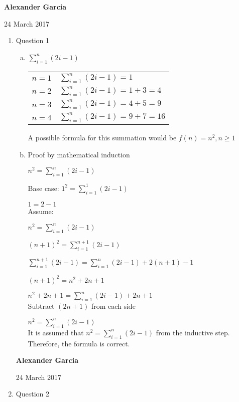 \documentclass[11pt]{article}
\begin{document}
\textbf{Alexander Garcia}

24 March 2017 \\
\begin{enumerate}

	\item Question 1

		\begin{enumerate}[(a)]

			\item $\sum^{n}_{i=1}(2i-1)$

				\begin{tabular}{ll}
					$n = 1$ & $\sum^{n}_{i=1} (2i-1) = 1$ \\

					$n = 2$ & $\sum^{n}_{i=1} (2i-1) = 1 + 3 = 4$ \\

					$n = 3$ & $\sum^{n}_{i=1} (2i-1) = 4 + 5 = 9$ \\

					$n = 4$ & $\sum^{n}_{i=1} (2i-1) = 9 + 7 = 16$ \\
				\end{tabular}

				A possible formula for this summation would be
				$f(n) = n^2, n \geq 1$ \\

			\item Proof by mathematical induction

				$n^2 = \sum^{n}_{i=1} (2i-1)$

				Base case: $1^2 = \sum^{1}_{i=1} (2i-1)$

				$1 = 2-1$ \\

				Assume:

				$n^2 = \sum^{n}_{i=1} (2i-1)$

				$(n+1)^2 = \sum^{n+1}_{i=1} (2i-1)$

				$\sum^{n+1}_{i=1} (2i-1) = \sum^{n}_{i=1} (2i-1) + 2(n+1)-1$

				$(n+1)^2 = n^2 + 2n + 1$

				$n^2 + 2n + 1 = \sum^{n}_{i=1} (2i-1) + 2n + 1$ \\

				Subtract $(2n+1)$ from each side

				$n^2 = \sum^{n}_{i=1} (2i-1)$ \\

				It is assumed that $n^2 = \sum^{n}_{i=1} (2i-1)$ from the
				inductive step. Therefore, the formula is correct.\\

		\end{enumerate}

		\newpage

		\textbf{Alexander Garcia}

		24 March 2017 \\

	\item Question 2

\end{enumerate}
\end{document}
